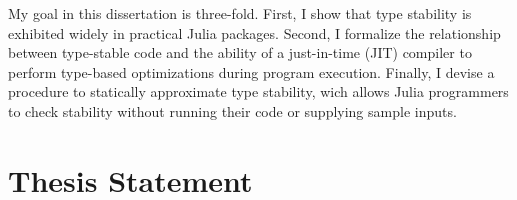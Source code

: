 My goal in this dissertation is three-fold.
%
First, I show that type stability is exhibited widely in practical Julia
packages.
%
Second, I formalize the relationship between type-stable code and the
ability of a just-in-time (JIT) compiler to perform type-based optimizations
during program execution.
%
Finally, I devise a procedure to statically approximate type stability, wich
allows Julia programmers to check stability without running their
code or supplying sample inputs.
%



\section{Thesis Statement}
\label{chap-problem}

